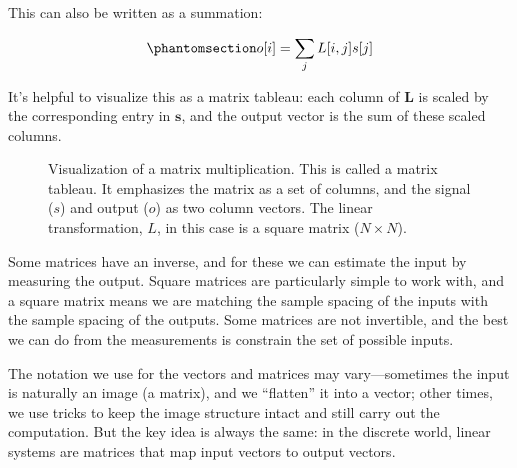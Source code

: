 \documentclass[
  letterpaper,
]{book}
\begin{document}
This can also be written as a summation:

\begin{equation}\phantomsection\label{eq-linear-matrix-summation}{
o[i] = \sum_j L[i,j] s[j] 
}\end{equation}

It's helpful to visualize this as a matrix tableau: each column of
\(\mathbf{L}\) is scaled by the corresponding entry in \(\mathbf{s}\),
and the output vector is the sum of these scaled columns.

\begin{figure}


\caption{\label{fig-ls-matrix-tableau}Visualization of a matrix
multiplication. This is called a matrix tableau. It emphasizes the
matrix as a set of columns, and the signal (\(s\)) and output (\(o\)) as
two column vectors. The linear transformation, \(L\), in this case is a
square matrix (\(N \times N\)).}

\end{figure}%

Some matrices have an inverse, and for these we can estimate the input
by measuring the output. Square matrices are particularly simple to work
with, and a square matrix means we are matching the sample spacing of
the inputs with the sample spacing of the outputs. Some matrices are not
invertible, and the best we can do from the measurements is constrain
the set of possible inputs.

The notation we use for the vectors and matrices may vary---sometimes
the input is naturally an image (a matrix), and we ``flatten'' it into a
vector; other times, we use tricks to keep the image structure intact
and still carry out the computation. But the key idea is always the
same: in the discrete world, linear systems are matrices that map input
vectors to output vectors.
\end{document}

